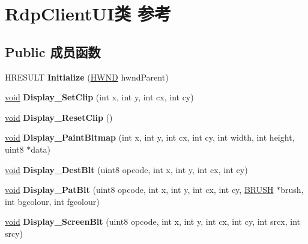 \hypertarget{class_rdp_client_u_i}{}\section{Rdp\+Client\+U\+I类 参考}
\label{class_rdp_client_u_i}
\subsection*{Public 成员函数}
\begin{DoxyCompactItemize}
\item 
\mbox{\label{class_rdp_client_u_i_aaa4568875e3fbfc13b1690a4d027d8b5}} 
H\+R\+E\+S\+U\+LT {\bfseries Initialize} (\hyperlink{interfacevoid}{H\+W\+ND} hwnd\+Parent)
\item 
\mbox{\label{class_rdp_client_u_i_aedeccf9d78567cc1d278119668554801}} 
\hyperlink{interfacevoid}{void} {\bfseries Display\+\_\+\+Set\+Clip} (int x, int y, int cx, int cy)
\item 
\mbox{\label{class_rdp_client_u_i_a5b5e8dd3c9abde9b1254d00d01840cb3}} 
\hyperlink{interfacevoid}{void} {\bfseries Display\+\_\+\+Reset\+Clip} ()
\item 
\mbox{\label{class_rdp_client_u_i_a9ddab59b0679c37d03ce3c1d985ffcb1}} 
\hyperlink{interfacevoid}{void} {\bfseries Display\+\_\+\+Paint\+Bitmap} (int x, int y, int cx, int cy, int width, int height, uint8 $\ast$data)
\item 
\mbox{\label{class_rdp_client_u_i_ad11e7004e6c236f02a9962b8648a1d49}} 
\hyperlink{interfacevoid}{void} {\bfseries Display\+\_\+\+Dest\+Blt} (uint8 opcode, int x, int y, int cx, int cy)
\item 
\mbox{\label{class_rdp_client_u_i_a8d07cc66efb54f8ba0752a61b630ca95}} 
\hyperlink{interfacevoid}{void} {\bfseries Display\+\_\+\+Pat\+Blt} (uint8 opcode, int x, int y, int cx, int cy, \hyperlink{class_b_r_u_s_h}{B\+R\+U\+SH} $\ast$brush, int bgcolour, int fgcolour)
\item 
\mbox{\label{class_rdp_client_u_i_abc19d899ecdaccccd72536de94f6f758}} 
\hyperlink{interfacevoid}{void} {\bfseries Display\+\_\+\+Screen\+Blt} (uint8 opcode, int x, int y, int cx, int cy, int srcx, int srcy)

\end{DoxyCompactItemize}
